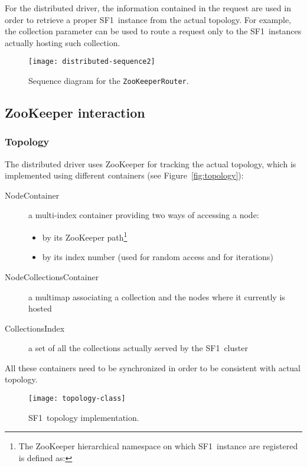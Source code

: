 \documentclass[a4paper,10pt]{article}
\newcommand{\sfr}{\textsf{SF1}}
\newcommand{\code}[1]{\textsf{#1}}
\begin{document}
For the distributed driver, the information contained in the request are used
in order to retrieve a proper \sfr\ instance from the actual topology.
For example, the \code{collection} parameter can be used to route a request only
to the \sfr\ instances actually hosting such collection.

\begin{figure}
 \centering
 \texttt{[image: distributed-sequence2]}
 \caption{Sequence diagram for the \texttt{ZooKeeperRouter}.}
 \label{fig:distributed-sequence2}
\end{figure}

\subsection{ZooKeeper interaction}

\subsubsection*{Topology}

The distributed driver uses ZooKeeper for tracking the actual topology, which
is implemented using different containers (see Figure~\vref{fig:topology}):
\begin{description}
 \item[\code{NodeContainer}] a multi-index container providing two ways of 
                             accessing a node:
 \begin{itemize}
  \item by its ZooKeeper path\footnote{The ZooKeeper hierarchical namespace on 
        which \sfr\ instance are registered is defined as:
}
  \item by its index number (used for random access and for iterations)
 \end{itemize}
 \item[\code{NodeCollectionsContainer}] a multimap associating a collection and the
                                        nodes where it currently is hosted
 \item[\code{CollectionsIndex}] a set of all the collections actually served by the \sfr\ cluster
\end{description}
All these containers need to be synchronized in order to be consistent with 
actual topology.
\begin{figure}
 \centering
 \texttt{[image: topology-class]}
 \caption{\sfr\ topology implementation.}
 \label{fig:topology}
\end{figure}
\end{document}
